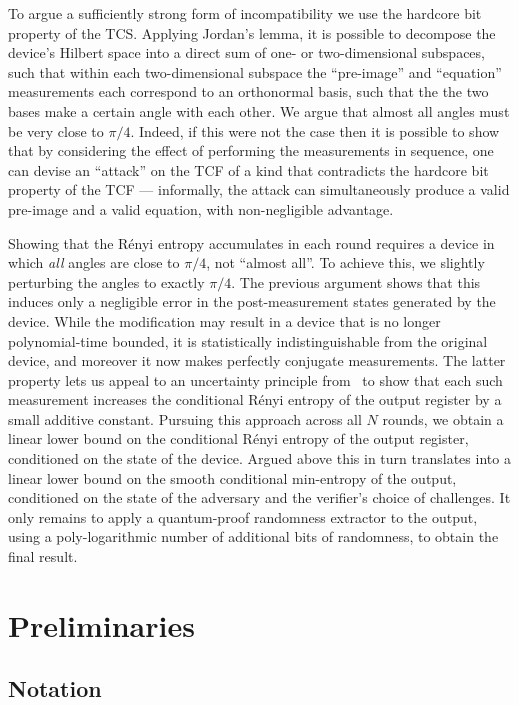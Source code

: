 \documentclass[11pt]{article}
\theoremstyle{remark}
\theoremstyle{definition}
\begin{document}
To argue a sufficiently strong form of incompatibility we use the hardcore bit property of the TCS. Applying Jordan's lemma, it is possible to decompose the device's Hilbert space into a direct sum of one- or two-dimensional subspaces, such that within each two-dimensional subspace the ``pre-image'' and ``equation'' measurements each correspond to an orthonormal basis, such that the the two bases make a certain angle with each other. We argue that almost all angles must be very close to $\pi/4$. Indeed, if this were not the case then it is possible to show that by considering the effect of performing the measurements in sequence, one can devise an ``attack'' on the TCF of a kind that contradicts the hardcore bit property of the TCF --- informally, the attack can simultaneously produce a valid pre-image and a valid equation, with non-negligible advantage. 

Showing that the R\'enyi entropy accumulates in each round requires a device in which \emph{all} angles are close to $\pi/4$, not ``almost all''. To achieve this, we slightly perturbing the angles to 
exactly $\pi/4$. The previous argument shows that this induces only a negligible error in the post-measurement states generated by the device. While the modification may result in a device that is no longer polynomial-time bounded, it is statistically indistinguishable from the original device, and moreover it now makes perfectly conjugate measurements. The latter property lets us appeal to
an uncertainty principle from~\cite{miller2014universal} to show that each such measurement increases the conditional R\'enyi entropy of the output register by a small additive constant. Pursuing this approach across all $N$ rounds, we obtain a linear lower bound on the conditional R\'enyi entropy of the output register, conditioned on the  state of the device. Argued above this in turn translates into a linear lower bound on the smooth conditional min-entropy of the output, conditioned on the state of the adversary and the verifier's choice of challenges. It only remains to apply a quantum-proof randomness extractor to the output, using a poly-logarithmic number of additional bits of randomness, to obtain the final result. 



\section{Preliminaries}

\subsection{Notation}
\end{document}
